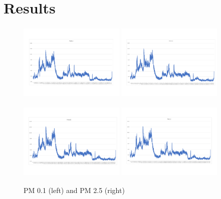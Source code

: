 \chapter{Results}



\begin{figure}[!htb]
	\includegraphics[width=0.45\textwidth, height = 10em]{body/fig/PM0.1.pdf}%
	\includegraphics[width=0.45\textwidth, height = 10em]{body/fig/PM2.5.pdf}%
	\caption{PM 0.1 (left) and PM 2.5 (right)}
	\label{ACEM1}
	\includegraphics[width=0.45\textwidth, height = 10em]{body/fig/PM4.pdf}%
	\includegraphics[width=0.45\textwidth, height = 10em]{body/fig/PM10.pdf}%
	\label{ACEM2}
\end{figure}
